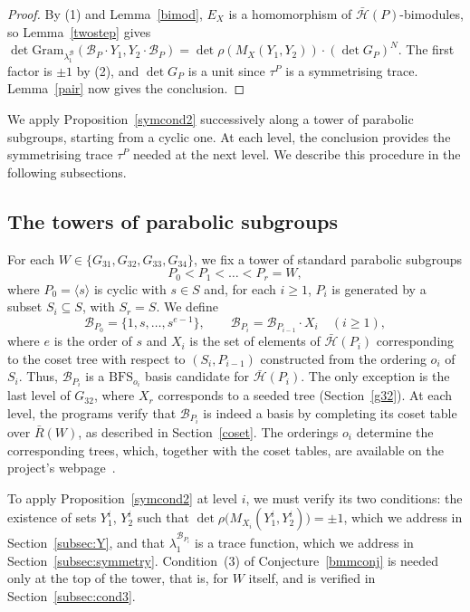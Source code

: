 \documentclass[11pt, reqno]{amsart}
\newcommand{\gram}{\mathrm{Gram}}
\newcommand{\cB}{\mathcal{B}}
\newcommand{\cH}{\mathcal{H}}
\newcommand{\BFS}{\mathrm{BFS}}
\numberwithin{equation}{section}
\theoremstyle{remark}
\begin{document}
\begin{proof}
	By (1) and Lemma~\ref{bimod}, $E_X$ is a homomorphism of
	$\bar{\cH}(P)$-bimodules, so Lemma~\ref{twostep} gives
	$\det\gram_{\lambda_1^{\cB}}(\cB_P\cdot Y_1,
	Y_2\cdot\cB_P)=\det\rho(M_X(Y_1,Y_2))\cdot(\det G_P)^N$. The
	first factor is $\pm1$ by (2), and $\det G_P$ is a unit since $\tau^P$
	is a symmetrising trace. Lemma~\ref{pair} now gives the
	conclusion.
\end{proof}


We apply Proposition~\ref{symcond2} successively along a tower of
parabolic subgroups, starting from a cyclic one. At each level, the
conclusion provides the symmetrising trace $\tau^P$ needed at the next
level. We describe this procedure in the following subsections.

\subsection{The towers of parabolic subgroups}\label{towers}
For each $W\in\{G_{31},G_{32},G_{33},G_{34}\}$, we fix a tower of standard parabolic subgroups
\[
P_0<P_1<\dots<P_r=W,
\]
where $P_0=\langle s\rangle$ is cyclic with $s\in S$ and, for each $i\ge1$, $P_i$ is generated by a subset $S_i\subseteq S$, with $S_r=S$. We define
\[
\cB_{P_0}=\{1,s,\dots,s^{e-1}\},\qquad
\cB_{P_i}=\cB_{P_{i-1}}\cdot X_i\quad(i\ge1),
\] 
where $e$ is the order of $s$ and $X_i$ is the set of elements of $\bar{\cH}(P_i)$ corresponding to the coset tree with respect to $(S_i,P_{i-1})$ constructed from the ordering $o_i$ of $S_i$. Thus, $\cB_{P_i}$ is a $\BFS_{o_i}$ basis candidate for $\bar{\cH}(P_i)$. The only exception is the last level of $G_{32}$, where $X_r$ corresponds to a seeded tree (Section~\ref{g32}).
At each level, the programs verify that $\cB_{P_i}$ is indeed a basis by completing its coset table over  $\bar R(W)$, as described in Section~\ref{coset}. The orderings $o_i$ determine the corresponding trees, which, together with the coset tables, are available on the project's webpage~\cite{web}.

To apply Proposition~\ref{symcond2} at level $i$, we must verify its
two conditions: the existence of sets $Y_1^i$, $Y_2^i$ such that
$\det\rho\big(M_{X_i}(Y_1^i,Y_2^i)\big)=\pm1$, which we address in
Section~\ref{subsec:Y}, and that $\lambda_1^{\cB_{P_i}}$ is a trace function, which
we address in Section~\ref{subsec:symmetry}. Condition~(3) of Conjecture~\ref{bmmconj} is needed only at the top of the tower, that is, for $W$ itself, and is verified in Section~\ref{subsec:cond3}.
\end{document}
